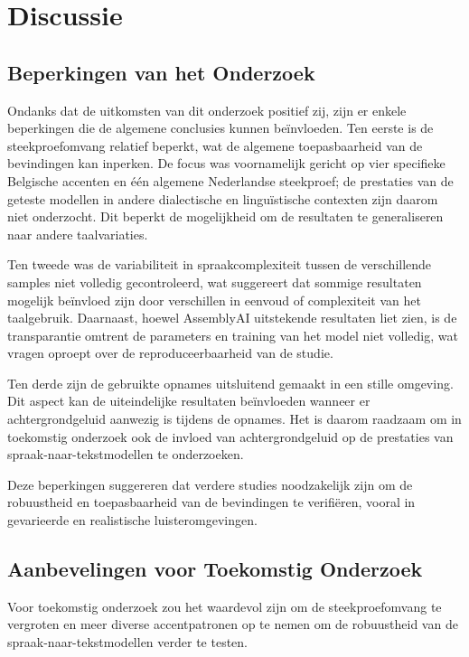 \section{Discussie}

\subsection{Beperkingen van het Onderzoek}

Ondanks dat de uitkomsten van dit onderzoek positief zij, zijn er enkele beperkingen die de algemene conclusies kunnen beïnvloeden. Ten eerste is de steekproefomvang relatief beperkt, wat de algemene toepasbaarheid van de bevindingen kan inperken. De focus was voornamelijk gericht op vier specifieke Belgische accenten en één algemene Nederlandse steekproef; de prestaties van de geteste modellen in andere dialectische en linguïstische contexten zijn daarom niet onderzocht. Dit beperkt de mogelijkheid om de resultaten te generaliseren naar andere taalvariaties.

Ten tweede was de variabiliteit in spraakcomplexiteit tussen de verschillende samples niet volledig gecontroleerd, wat suggereert dat sommige resultaten mogelijk beïnvloed zijn door verschillen in eenvoud of complexiteit van het taalgebruik. Daarnaast, hoewel AssemblyAI uitstekende resultaten liet zien, is de transparantie omtrent de parameters en training van het model niet volledig, wat vragen oproept over de reproduceerbaarheid van de studie.

Ten derde zijn de gebruikte opnames uitsluitend gemaakt in een stille omgeving. Dit aspect kan de uiteindelijke resultaten beïnvloeden wanneer er achtergrondgeluid aanwezig is tijdens de opnames. Het is daarom raadzaam om in toekomstig onderzoek ook de invloed van achtergrondgeluid op de prestaties van spraak-naar-tekstmodellen te onderzoeken.

Deze beperkingen suggereren dat verdere studies noodzakelijk zijn om de robuustheid en toepasbaarheid van de bevindingen te verifiëren, vooral in gevarieerde en realistische luisteromgevingen.
 
\subsection{Aanbevelingen voor Toekomstig Onderzoek}

Voor toekomstig onderzoek zou het waardevol zijn om de steekproefomvang te vergroten en meer diverse accentpatronen op te nemen om de robuustheid van de spraak-naar-tekstmodellen verder te testen.

